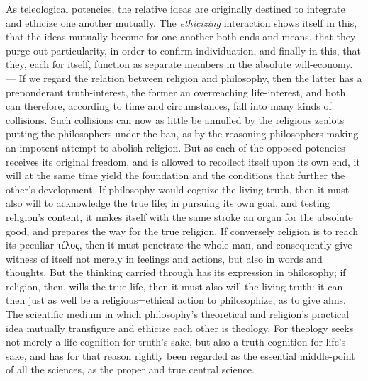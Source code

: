 \documentclass[12pt]{book}
\begin{document}
As teleological potencies, the relative ideas are originally destined to
integrate and ethicize one another mutually. The \emph{ethicizing}
interaction shows itself in this, that the ideas mutually become for one
another both ends and means, that they purge out particularity, in order to
confirm individuation, and finally in this, that they, each for itself,
function as separate members in the absolute will-economy. --- If we regard
the relation between religion and philosophy, then the latter has a
preponderant truth-interest, the former an overreaching life-interest, and
both can therefore, according to time and circumstances, fall into many
kinds of collisions. Such collisions can now as little be annulled by the
religious zealots putting the philosophers under the ban, as by the
reasoning philosophers making an impotent attempt to abolish religion. But
as each of the opposed potencies receives its original freedom, and is
allowed to recollect itself upon its own end, it will at the same time yield
the foundation and the conditions that further the other's development. If
philosophy would cognize the living truth, then it must also will to
acknowledge the true life; in pursuing its own goal, and testing religion's
content, it makes itself with the same stroke an organ for the absolute
good, and prepares the way for the true religion. If conversely religion is
to reach its peculiar τέλος, then it must penetrate the whole man, and
consequently give witness of itself not merely in feelings and actions, but
also in words and thoughts. But the thinking carried through has its
expression in philosophy; if religion, then, wills the true life, then it
must also will the living truth: it can then just as well be a
religious=ethical action to philosophize, as to give alms. The scientific
medium in which philosophy's theoretical and religion's practical idea
mutually transfigure and ethicize each other is theology. For theology seeks
not merely a life-cognition for truth's sake, but also a truth-cognition for
life's sake, and has for that reason rightly been regarded as the essential
middle-point of all the sciences, as the proper and true central science.
\end{document}
